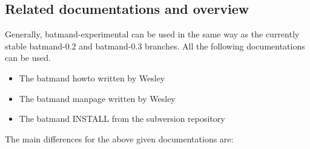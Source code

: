 \documentclass[11pt]{article}
\begin{document}
\subsection{Related documentations and overview}

%


Generally, batmand-experimental can be used in the same way as the currently stable batmand-0.2 and batmand-0.3 branches. All the following documentations can be used.
\begin{itemize}
 \item The batmand howto written by Wesley \cite{wesley-batmand-howto}
 \item The batmand manpage written by Wesley \cite{wesley-batmand-manpage}
 \item The batmand INSTALL from the subversion repository \cite{svn-batmand-install}
\end{itemize}
%
The main differences for the above given documentations are:
\end{document}
